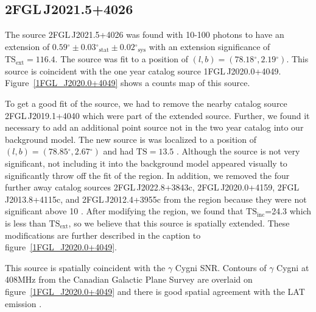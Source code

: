 \documentclass[12pt,preprint]{aastex}
\newcommand{\gev}{\text{GeV}\xspace}
\newcommand{\tsext}{{\ensuremath{\text{TS}_{\text{ext}}}}\xspace}
\newcommand{\tsinc}{\ensuremath{\text{TS}_{\text{inc}}}\xspace}
\newcommand{\ts}{\text{TS}\xspace}
\newcommand{\sys}{\text{sys}\xspace}
\newcommand{\stat}{\text{stat}\xspace}
\renewcommand{\deg}{\ensuremath{^\circ}\xspace}
\begin{document}
\subsection{2FGL\,J2021.5+4026}
\label{section_2FGL J2021.5+4026}



The source 2FGL\,J2021.5+4026 was found with 10-100 \gev
photons to have an extension of $0.59\deg\pm0.03\deg_\stat\pm0.02\deg_\sys$
with an extension significance of $\tsext=116.4$.  The source was
fit to a position of $(l,b)=(78.18\deg,2.19\deg)$.  This source
is coincident with the one year catalog source 1FGL\,J2020.0+4049.
Figure~\ref{1FGL_J2020.0+4049} shows a counts map of this source.

To get a good fit of the source, we had to remove the nearby catalog
source 2FGL\,J2019.1+4040 which were part of the extended source.
Further, we found it necessary to add an additional point source not in
the two year catalog into our background model.  The new source is was
localized to a position of $(l,b)=(78.85\deg,2.67\deg)$ and had $\ts=13.5$ .
Although the source is not very significant, not including it into the
background model appeared visually to significantly throw off the fit
of the region.  In addition, we removed the four further away catalog
sources 2FGL\,J2022.8+3843c, 2FGL\,J2020.0+4159, 2FGL\,J2013.8+4115c,
and 2FGL\,J2012.4+3955c from the region because they were not significant
above 10 \gev.  After modifying the region, we found that \tsinc=24.3
which is less than \tsext, so we believe that this source is spatially
extended.  These modifications are further described in the caption to
figure~\ref{1FGL_J2020.0+4049}.

This source is spatially coincident with the $\gamma$ Cygni SNR.  Contours of
$\gamma$ Cygni at 408MHz from the Canadian Galactic Plane Survey are overlaid
on figure~\ref{1FGL_J2020.0+4049} and there is good spatial agreement
with the LAT emission \citep{canadian_galactic_plane_survey}.




\end{document}
